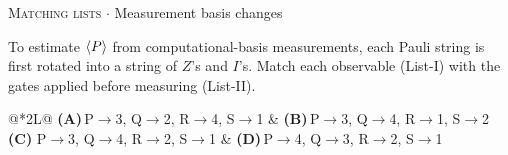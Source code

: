 \documentclass[11pt,a4paper]{article}
\newcommand{\optlabel}[1]{\textbf{(#1)}}
\newcommand{\correctlabel}[1]{\textcolor{okgreen}{\textbf{(#1)}\,\ding{51}}}
\newenvironment{qitem}[1]{\begin{list}{}{\setlength{\leftmargin}{3.3em}\setlength{\labelwidth}{3.1em}%
  \setlength{\labelsep}{0.2em}\setlength{\topsep}{3pt}\setlength{\parsep}{3pt}}\item[\textbf{Q.#1}\hfill]}{\end{list}}
\newcommand{\qmeta}[2]{{\footnotesize\color{black!60}\textsc{#1} \;$\cdot$\; #2}\par}
\begin{document}
\begin{qitem}{24}
\qmeta{Matching lists}{Measurement basis changes}
To estimate $\braket P$ from computational-basis measurements, each Pauli string is first rotated into a string of $Z$'s and $I$'s. Match each
observable (List-I) with the gates applied before measuring (List-II).
\par\smallskip{}
\par\smallskip\noindent\begin{tabularx}{\linewidth}{@{}*{2}{L}@{}}
\optlabel{A}\,P$\to$3, Q$\to$2, R$\to$4, S$\to$1 & \optlabel{B}\,P$\to$3, Q$\to$4, R$\to$1, S$\to$2 \\[3pt]
\correctlabel{C}\,P$\to$3, Q$\to$4, R$\to$2, S$\to$1 & \optlabel{D}\,P$\to$4, Q$\to$3, R$\to$2, S$\to$1
\end{tabularx}
\end{qitem}
\end{document}
